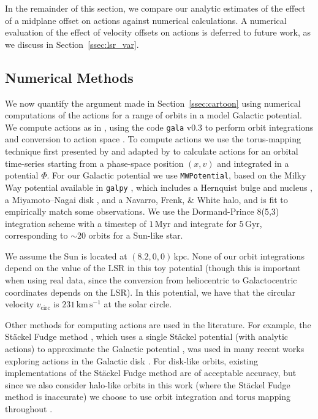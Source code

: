\documentclass[twocolumn]{aastex62}
\newcommand{\kpc}{\text{kpc}}
\newcommand{\Myr}{\text{Myr}}
\newcommand{\Gyr}{\text{Gyr}}
\newcommand{\kms}{\text{km}\,\text{s}^{-1}}
\begin{document}
In the remainder of this section, we compare our analytic estimates of the
effect of a midplane offset on actions against numerical calculations. A
numerical evaluation of the effect of velocity offsets on actions is deferred
to future work, as we discuss in Section~\ref{ssec:lsr_var}.

\subsection{Numerical Methods} \label{ssec:action_comp}
We now quantify the argument made in Section~\ref{ssec:cartoon} using
numerical computations of the actions for a range of orbits in a model
Galactic potential. We compute actions as in \citet{2018ApJ...867...31B},
using the code \texttt{gala} v0.3 to perform orbit integrations and conversion
to action space \citep{2017JOSS....2..388P,Price-Whelan:2018}. To compute
actions we use the torus-mapping technique first presented by
\citet{1990MNRAS.244..634M} and adapted by \citet{2014MNRAS.441.3284S} to
calculate actions for an orbital time-series starting from a phase-space
position $(x, v)$ and integrated in a potential $\Phi$. For our Galactic potential we use \texttt{MWPotential}, based on the Milky Way
potential available in \texttt{galpy} \citep{2015ApJS..216...29B}, which includes a Hernquist bulge and nucleus \citep{1990ApJ...356..359H},
a Miyamoto--Nagai disk \citep{1975PASJ...27..533M}, and 
a Navarro, Frenk, \& White \citeyear{1997ApJ...490..493N} halo,
and is fit to empirically match some
observations.
We use the Dormand-Prince 8(5,3) integration scheme
\citep{Dormand80:integrator} with a timestep of $1\,\Myr$ and integrate for
$5\,\Gyr$, corresponding to $\sim 20$ orbits for a Sun-like star.

We assume the Sun is located at $(8.2, 0, 0)\,\kpc$. None of our orbit
integrations depend on the value of the LSR in this toy potential (though this
is important when using real data, since the conversion from heliocentric to
Galactocentric coordinates depends on the LSR). In this potential, we have
that the circular velocity $v_{\text{circ}}$ is $231\,\kms$ at the solar
circle.

Other methods for computing actions are used in the literature. For example,
the St\"ackel Fudge method \citep{2016MNRAS.457.2107S}, which uses a single
St\"ackel potential (with analytic actions) to approximate the Galactic
potential \citep{1985MNRAS.216..273D, 2012MNRAS.426.1324B}, was used in many
recent works exploring actions in the Galactic disk
\citep[e.g.,][]{2019MNRAS.484.3291T, 2018MNRAS.481.4093S, 2018arXiv180803278T}.
For disk-like orbits, existing implementations of the St\"ackel Fudge method
are of acceptable accuracy, but since we also consider halo-like orbits in
this work (where the St\"ackel Fudge method is inaccurate) we choose to use
orbit integration and torus mapping throughout \citep{2016MNRAS.457.2107S}.
\end{document}
